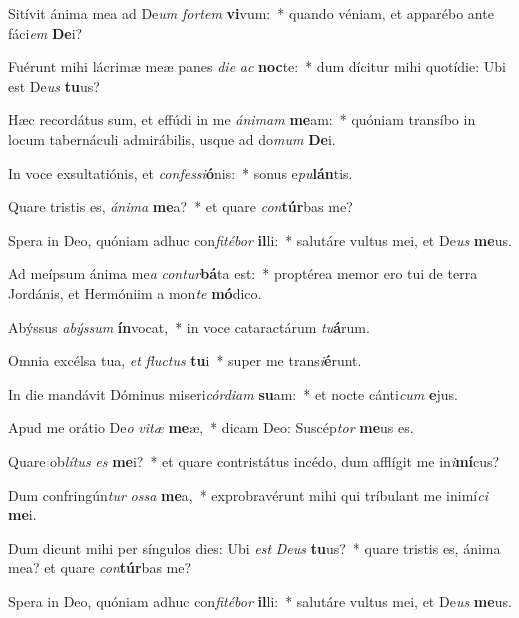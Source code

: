 \item Sitívit ánima mea ad De\textit{um} \textit{for}\textit{tem} \textbf{vi}vum:~* quando véniam, et apparébo ante fáci\textit{em} \textbf{De}i?
\item Fuérunt mihi lácrimæ meæ panes \textit{di}\textit{e} \textit{ac} \textbf{noc}te:~* dum dícitur mihi quotídie: Ubi est De\textit{us} \textbf{tu}us?
\item Hæc recordátus sum, et effúdi in me \textit{á}\textit{ni}\textit{mam} \textbf{me}am:~* quóniam transíbo in locum tabernáculi admirábilis, usque ad do\textit{mum} \textbf{De}i.
\item In voce exsultatiónis, et \textit{con}\textit{fes}\textit{si}\textbf{ó}nis:~* sonus e\textit{pu}\textbf{lán}tis.
\item Quare tristis es, \textit{á}\textit{ni}\textit{ma} \textbf{me}a?~* et quare \textit{con}\textbf{túr}bas me?
\item Spera in Deo, quóniam adhuc con\textit{fi}\textit{té}\textit{bor} \textbf{il}li:~* salutáre vultus mei, et De\textit{us} \textbf{me}us.
\item Ad meípsum ánima me\textit{a} \textit{con}\textit{tur}\textbf{bá}ta est:~* proptérea memor ero tui de terra Jordánis, et Hermóniim a mon\textit{te} \textbf{mó}dico.
\item Abýssus \textit{a}\textit{býs}\textit{sum} \textbf{ín}vocat,~* in voce cataractárum \textit{tu}\textbf{á}rum.
\item Omnia excélsa tua, \textit{et} \textit{fluc}\textit{tus} \textbf{tu}i~* super me trans\textit{i}\textbf{é}runt.
\item In die mandávit Dóminus miseri\textit{cór}\textit{di}\textit{am} \textbf{su}am:~* et nocte cánti\textit{cum} \textbf{e}jus.
\item Apud me orátio De\textit{o} \textit{vi}\textit{tæ} \textbf{me}æ,~* dicam Deo: Suscép\textit{tor} \textbf{me}us es.
\item Quare ob\textit{lí}\textit{tus} \textit{es} \textbf{me}i?~* et quare contristátus incédo, dum afflígit me in\textit{i}\textbf{mí}cus?
\item Dum confringún\textit{tur} \textit{os}\textit{sa} \textbf{me}a,~* exprobravérunt mihi qui tríbulant me inimí\textit{ci} \textbf{me}i.
\item Dum dicunt mihi per síngulos dies: Ubi \textit{est} \textit{De}\textit{us} \textbf{tu}us?~* quare tristis es, ánima mea? et quare \textit{con}\textbf{túr}bas me?
\item Spera in Deo, quóniam adhuc con\textit{fi}\textit{té}\textit{bor} \textbf{il}li:~* salutáre vultus mei, et De\textit{us} \textbf{me}us.
